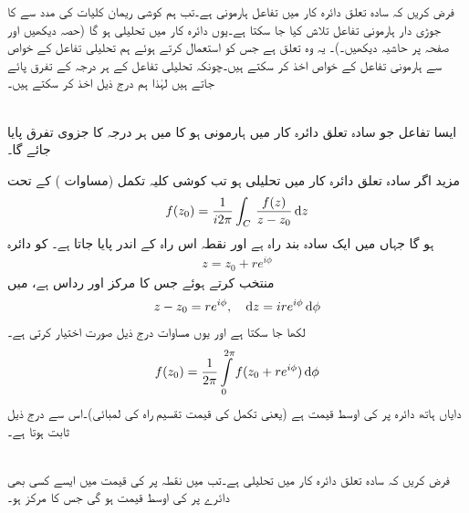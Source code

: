 فرض کریں کہ سادہ تعلق دائرہ کار  میں تفاعل  ہارمونی ہے۔تب ہم کوشی ریمان کلیات کی مدد سے  کا جوڑی دار ہارمونی تفاعل  تلاش کیا جا سکتا ہے۔یوں   دائرہ کار  میں تحلیلی ہو گا (حصہ  دیکھیں اور  صفحہ  پر حاشیہ دیکھیں۔)۔ یہ وہ تعلق ہے جس کو استعمال کرتے ہوئے ہم تحلیلی تفاعل کے خواص سے ہارمونی تفاعل کے خواص اخذ کر سکتے ہیں۔چونکہ تحلیلی تفاعل کے ہر درجہ کے تفرق پائے جاتے ہیں لہٰذا ہم درج ذیل اخذ کر سکتے ہیں۔

\quad {}\\
 ایسا تفاعل  جو سادہ تعلق دائرہ کار  میں ہارمونی ہو کا   میں ہر درجہ کا جزوی تفرق پایا جائے گا۔  

مزید اگر سادہ تعلق دائرہ کار  میں  تحلیلی ہو تب کوشی کلیہ تکمل (مساوات ) کے تحت
\begin{align}\label{مساوات_مخلوط_مخفی_خواص_الف}
f(z_0)=\frac{1}{i2\pi}\int_C\,\frac{f(z)}{z-z_0}\dif z
\end{align}
ہو گا جہاں   میں  ایک سادہ بند راہ ہے اور نقطہ  اس راہ کے اندر پایا جاتا ہے۔ کو دائرہ
\begin{align*}
z=z_0+re^{i\phi}
\end{align*} 
 منتخب کرتے ہوئے جس کا مرکز  اور رداس  ہے،   میں 
\begin{align*}
z-z_0=re^{i\phi},\quad \dif z=ire^{i\phi}\dif \phi
\end{align*}
لکھا جا سکتا ہے اور یوں مساوات   درج ذیل صورت اختیار کرتی ہے۔
\begin{align}\label{مساوات_مخفی_قوہ_کوشی_تکمل_کلیہ_رداس_زاویہ_الف}
f(z_0)=\frac{1}{2\pi}\int\limits_0^{2\pi} f(z_0+re^{i\phi})\dif \phi
\end{align}
دایاں ہاتھ دائرہ  پر  کی اوسط قیمت ہے (یعنی تکمل کی قیمت تقسیم راہ کی لمبائی)۔اس سے درج ذیل ثابت ہوتا ہے۔

\quad {}\\
فرض کریں کہ سادہ تعلق دائرہ کار  میں  تحلیلی ہے۔تب  میں نقطہ  پر  کی قیمت  میں ایسے کسی بھی دائرے پر  کی اوسط قیمت ہو گی جس کا مرکز  ہو۔ 

